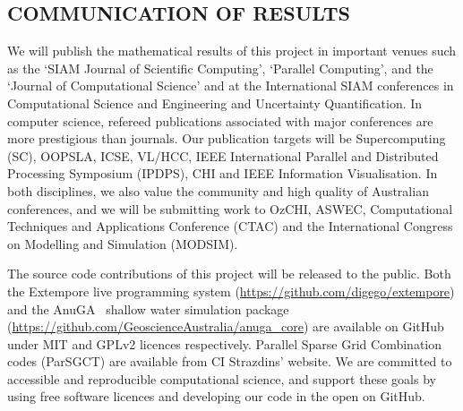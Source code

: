 \subsection*{COMMUNICATION OF RESULTS}


We will publish the mathematical results of this
project in important venues such as the `SIAM Journal of
Scientific Computing', `Parallel Computing', and the `Journal of
Computational Science' and at the International SIAM conferences in Computational Science and Engineering and Uncertainty Quantification. 
In computer science, refereed publications
associated with major conferences are more prestigious than
journals. Our publication targets will be Supercomputing (SC), OOPSLA, ICSE, VL/HCC,
 IEEE International Parallel and Distributed
Processing Symposium (IPDPS), CHI and IEEE Information Visualisation. In both disciplines, we
also value the community and high quality of Australian conferences,
and we will be submitting work to OzCHI, ASWEC, Computational
Techniques and Applications Conference (CTAC) and the International 
Congress on Modelling and Simulation (MODSIM). 


The source code contributions of this project will be
released to the public. Both the Extempore live programming system
(\url{https://github.com/digego/extempore}) and the
 AnuGA~\parencite{anugamanual,nielsen2005hydrodynamic} 
shallow
water simulation package
(\url{https://github.com/GeoscienceAustralia/anuga_core}) are
available on GitHub under MIT and GPLv2 licences respectively.
Parallel Sparse Grid Combination codes (ParSGCT) are available from CI
Strazdins' website.  We are committed to accessible and reproducible
computational science, and support these goals by using free software
licences and developing our code in the open on GitHub.

